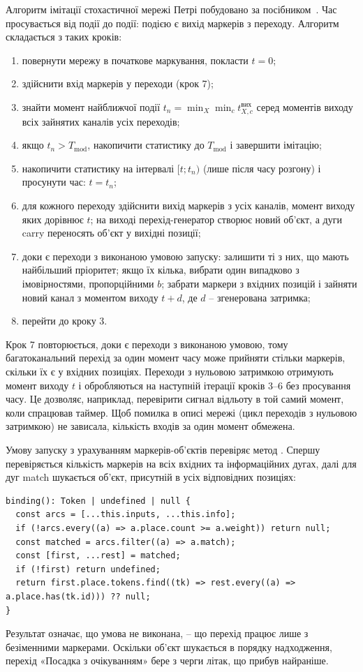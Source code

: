 Алгоритм імітації стохастичної мережі Петрі побудовано за посібником~\cite{stetsenko2024}. Час просувається від події до події: подією є вихід маркерів з переходу. Алгоритм складається з таких кроків:
\begin{enumerate}[label=\arabic*)]
\item повернути мережу в початкове маркування, покласти $t = 0$;
\item здійснити вхід маркерів у переходи (крок 7);
\item знайти момент найближчої події $t_{n} = \min_X \min_c t^{\text{вих}}_{X, c}$ серед моментів виходу всіх зайнятих каналів усіх переходів;
\item якщо $t_{n} > T_{\text{mod}}$, накопичити статистику до $T_{\text{mod}}$ і завершити імітацію;
\item накопичити статистику на інтервалі $[t; t_n)$ (лише після часу розгону) і просунути час: $t = t_n$;
\item для кожного переходу здійснити вихід маркерів з усіх каналів, момент виходу яких дорівнює $t$; на виході перехід-генератор створює новий об'єкт, а дуги carry переносять об'єкт у вихідні позиції;
\item доки є переходи з виконаною умовою запуску: залишити ті з них, що мають найбільший пріоритет; якщо їх кілька, вибрати один випадково з імовірностями, пропорційними $b$; забрати маркери з вхідних позицій і зайняти новий канал з моментом виходу $t + d$, де $d$ -- згенерована затримка;
\item перейти до кроку 3.
\end{enumerate}

Крок 7 повторюється, доки є переходи з виконаною умовою, тому багатоканальний перехід за один момент часу може прийняти стільки маркерів, скільки їх є у вхідних позиціях. Переходи з нульовою затримкою отримують момент виходу $t$ і обробляються на наступній ітерації кроків 3--6 без просування часу. Це дозволяє, наприклад, перевірити сигнал відльоту в той самий момент, коли спрацював таймер. Щоб помилка в описі мережі (цикл переходів з нульовою затримкою) не зависала, кількість входів за один момент обмежена.

Умову запуску з урахуванням маркерів-об'єктів перевіряє метод . Спершу перевіряється кількість маркерів на всіх вхідних та інформаційних дугах, далі для дуг match шукається об'єкт, присутній в усіх відповідних позиціях:
\begin{Verbatim}
binding(): Token | undefined | null {
  const arcs = [...this.inputs, ...this.info];
  if (!arcs.every((a) => a.place.count >= a.weight)) return null;
  const matched = arcs.filter((a) => a.match);
  const [first, ...rest] = matched;
  if (!first) return undefined;
  return first.place.tokens.find((tk) => rest.every((a) => a.place.has(tk.id))) ?? null;
}
\end{Verbatim}
Результат  означає, що умова не виконана,  -- що перехід працює лише з безіменними маркерами. Оскільки об'єкт шукається в порядку надходження, перехід «Посадка з очікуванням» бере з черги літак, що прибув найраніше.

